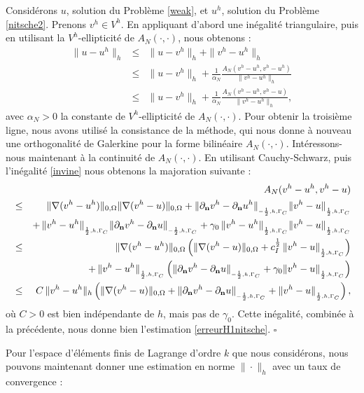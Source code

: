 \documentclass[11pt]{book}
\newcommand{\beqs}{\begin{eqnarray*}}
\newcommand{\eeqs}{\end{eqnarray*}}
\newcommand{\cqfd}{{$\mbox{}$\hfill$\square$}}
\def\n{{\bf n}}
\newcommand{\Gc}{\Gamma_{C}}
\newcommand{\dnu}{\partial_{\n} u}
\newcommand{\dnv}{\partial_{\n} v}
\newcommand{\nngc}[1]{\|{#1}\|_{_{-\frac12,h,\Gc}}}
\newcommand{\npgc}[1]{\|{#1}\|_{_{\frac12,h,\Gc}}}
\begin{document}
\proof Considérons $u$, solution du Problème \eqref{weak}, et $u^h$, solution du Problème \eqref{nitsche2}. Prenons $v^h \in V^h$. En appliquant d'abord une inégalité triangulaire, puis en utilisant la $V^h$-ellipticité de $A_N(\cdot,\cdot)$, nous obtenons :
\begin{eqnarray*}
\| u - u^h \|_{h} & \leq & \| u - v^h \|_{h} + \| v^h - u^h \|_{h} \\
   & \leq & \| u - v^h \|_{h} + \frac1{\alpha_N} \frac{A_N ( v^h - u^h , v^h - u^h )}{\| v^h - u^h \|_{h}} \\
   & \leq & \| u - v^h \|_{h} + \frac1{\alpha_N} \frac{A_N ( v^h - u^h , v^h - u )}{\| v^h - u^h \|_{h}},
  \end{eqnarray*}
avec $\alpha_N > 0$ la constante de $V^h$-ellipticité de $A_N(\cdot,\cdot)$. 
Pour obtenir la troisième ligne, nous avons utilisé la consistance de la méthode, qui nous donne à nouveau une orthogonalité de Galerkine pour la forme bilinéaire $A_N(\cdot,\cdot)$.
Intéressons-nous maintenant à la continuité de $A_N(\cdot,\cdot)$. En utilisant Cauchy-Schwarz, puis l'inégalité \eqref{invine} nous obtenons la majoration suivante :
\beqs
 & & A_N ( v^h - u^h , v^h - u ) \\ & \leq &
 \| \nabla ( v^h - u^h ) \|_{0,\Omega} \| \nabla (v^h - u) \|_{0,\Omega} +
 \nngc{ \dnv^h - \dnu^h} \npgc{ v^h - u } \\ & &
 + \, \npgc{ v^h - u^h} \nngc{ \dnv^h - \dnu } +
 \gamma_0 \, \npgc{ v^h - u^h } \npgc{ v^h - u} \\
 & \leq &
 \| \nabla ( v^h - u^h ) \|_{0,\Omega} \left ( \| \nabla (v^h - u) \|_{0,\Omega} +
 c_I^{\frac12}\, \npgc{ v^h - u } \right )\\ & &
 + \, \npgc{ v^h - u^h} \left ( \nngc{ \dnv^h - \dnu } + \gamma_0 \npgc{ v^h - u} \right )\\
 & \leq & C\, \| v^h - u^h \|_h
 \left ( \| \nabla (v^h - u) \|_{0,\Omega} + \nngc{ \dnv^h - \dnu }
 + \npgc{ v^h - u } \right ),
\eeqs
où $C>0$ est bien indépendante de $h$, mais pas de $\gamma_0$.
Cette inégalité, combinée à la précédente, nous donne bien l'estimation \eqref{erreurH1nitsche}.
\cqfd 

\medskip

Pour l'espace d'éléments finis de Lagrange d'ordre $k$ que nous considérons, nous pouvons maintenant donner une estimation en norme $\|\cdot\|_h$ avec un taux de convergence :
\end{document}
